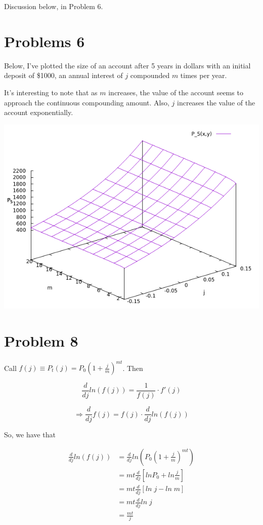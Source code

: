 \documentclass[12pt]{article}
\begin{document}
Discussion below, in Problem 6.

\section*{Problems 6}

Below, I've plotted the size of an account after 5 years in dollars with an initial
 deposit of \$1000, an annual interest of $j$ compounded $m$ times per year.
 
 It's interesting to note that as $m$ increases, the value of the account seems to 
 approach the continuous compounding amount. Also, $j$ increases the value of the account
 exponentially.
 
\begin{center}
	\includegraphics[scale=0.5]{screenshot2.png}
\end{center}

\section*{Problem 8}
Call $f(j) \equiv P_t(j) = P_0(1+\frac{j}{m})^{mt}$. Then 

\newcommand{\dv}[1]{\frac{d}{d#1}}

$$\dv j ln(f(j))=\frac{1}{f(j)}\cdot f'(j)$$

$$\Rightarrow \dv j f(j) = f(j)\cdot \dv{j}ln(f(j))$$

So, we have that

\begin{align*}
\dv j ln(f(j)) &= \dv j ln(P_0(1+\frac{j}{m})^{mt}) \\
	&= mt \dv j [ln P_0 + ln\frac{j}{m}] \\
	&= mt\dv j[ln\; j - ln\; m]\\
	&= mt\dv j ln\; j\\
	&= \frac{mt}{j}
\end{align*}
\end{document}
